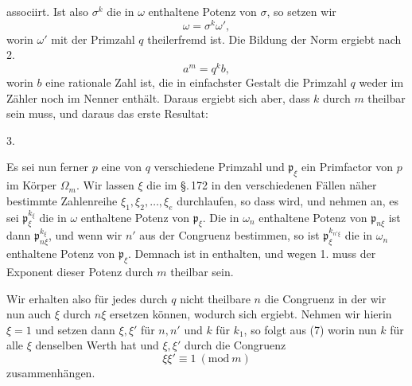 associirt. Ist also $\sigma^k$ die in $\omega$ enthaltene Potenz von $\sigma$, so setzen wir
\[
\omega = \sigma^k \omega',
\]
worin $\omega'$ mit der Primzahl $q$ theilerfremd ist. Die Bildung der Norm ergiebt nach 2.
\[
a^m = q^k b,
\]
worin $b$ eine rationale Zahl ist, die in einfachster Gestalt die Primzahl $q$ weder im Zähler noch im Nenner enthält. Daraus ergiebt sich aber, dass $k$ durch $m$ theilbar sein muss, und daraus das erste Resultat:

3. 

Es sei nun ferner $p$ eine von $q$ verschiedene Primzahl und $\mathfrak{p}_\xi$ ein Primfactor von $p$ im Körper $\Omega_m$. Wir lassen $\xi$ die im \S.\,172 in den verschiedenen Fällen näher bestimmte Zahlenreihe $\xi_1, \xi_2, \ldots, \xi_e$ durchlaufen, so dass
wird, und nehmen an, es sei $\mathfrak{p}_\xi^{k_\xi}$ die in $\omega$ enthaltene Potenz von $\mathfrak{p}_\xi$. Die in $\omega_n$ enthaltene Potenz von $\mathfrak{p}_{n\xi}$ ist dann $\mathfrak{p}_{n\xi}^{k_\xi}$, und wenn wir $n'$ aus der Congruenz
bestimmen, so ist $\mathfrak{p}_\xi^{k_{n'\xi}}$ die in $\omega_n$ enthaltene Potenz von $\mathfrak{p}_\xi$. Demnach ist in
enthalten, und wegen 1. muss der Exponent dieser Potenz durch $m$ theilbar sein.

Wir erhalten also für jedes durch $q$ nicht theilbare $n$ die Congruenz
in der wir nun auch $\xi$ durch $n\xi$ ersetzen können, wodurch sich
ergiebt. Nehmen wir hierin $\xi = 1$ und setzen dann $\xi, \xi'$ für $n, n'$ und $k$ für $k_1$, so folgt aus (7)
worin nun $k$ für alle $\xi$ denselben Werth hat und $\xi, \xi'$ durch die Congruenz
\[
\xi \xi' \equiv 1 \ (\mathrm{mod}\ m)
\]
zusammenhängen.
